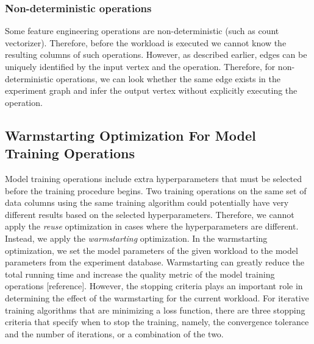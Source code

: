 \subsubsection{Non-deterministic operations}
Some feature engineering operations are non-deterministic (such as count vectorizer).
Therefore, before the workload is executed we cannot know the resulting columns of such operations.
However, as described earlier, edges can be uniquely identified by the input vertex and the operation.
Therefore, for non-deterministic operations, we can look whether the same edge exists in the experiment graph and infer the output vertex without explicitly executing the operation.


\subsection{Warmstarting Optimization For Model Training Operations}
Model training operations include extra hyperparameters that must be selected before the training procedure begins.
Two training operations on the same set of data columns using the same training algorithm could potentially have very different results based on the selected hyperparameters.
Therefore, we cannot apply the \textit{reuse} optimization in cases where the hyperparameters are different.
Instead, we apply the \textit{warmstarting} optimization.
In the warmstarting optimization, we set the model parameters of the given workload to the model parameters from the experiment database.
Warmstarting can greatly reduce the total running time and increase the quality metric of the model training operations [reference].
However, the stopping criteria plays an important role in determining the effect of the warmstarting for the current workload.
For iterative training algorithms that are minimizing a loss function, there are three stopping criteria that specify when to stop the training, namely, the convergence tolerance and the number of iterations, or a combination of the two.

